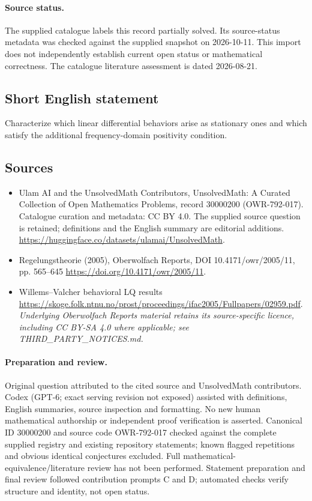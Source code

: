 \documentclass[11pt]{article}
\begin{document}
\paragraph{Source status.}
The supplied catalogue labels this record partially solved. Its source-status metadata was checked against the supplied snapshot on 2026-10-11. This import does not independently establish current open status or mathematical correctness. The catalogue literature assessment is dated 2026-08-21.
\subsection{Short English statement}
Characterize which linear differential behaviors arise as stationary ones and which satisfy the additional frequency-domain positivity condition.
\subsection{Sources}
\begin{itemize}
\item[\hypertarget{source:30000200:1}{S1}] Ulam AI and the UnsolvedMath Contributors, UnsolvedMath: A Curated Collection of Open Mathematics Problems, record 30000200 (OWR-792-017). Catalogue curation and metadata: CC BY 4.0. The supplied source question is retained; definitions and the English summary are editorial additions.
\url{https://huggingface.co/datasets/ulamai/UnsolvedMath}.
\item[\hypertarget{source:30000200:2}{S2}] Regelungstheorie (2005), Oberwolfach Reports, DOI 10.4171/owr/2005/11, pp. 565--645
\url{https://doi.org/10.4171/owr/2005/11}.
\item[\hypertarget{source:30000200:3}{S3}] Willems--Valcher behavioral LQ results
\url{https://skoge.folk.ntnu.no/prost/proceedings/ifac2005/Fullpapers/02959.pdf}.
\textit{Underlying Oberwolfach Reports material retains its source-specific licence, including CC BY-SA 4.0 where applicable; see THIRD\_PARTY\_NOTICES.md.}
\end{itemize}
\paragraph{Preparation and review.}
Original question attributed to the cited source and UnsolvedMath contributors. Codex (GPT-6; exact serving revision not exposed) assisted with definitions, English summaries, source inspection and formatting. No new human mathematical authorship or independent proof verification is asserted. Canonical ID 30000200 and source code OWR-792-017 checked against the complete supplied registry and existing repository statements; known flagged repetitions and obvious identical conjectures excluded. Full mathematical-equivalence/literature review has not been performed. Statement preparation and final review followed contribution prompts C and D; automated checks verify structure and identity, not open status.
\label{end:30000200}
\end{document}

